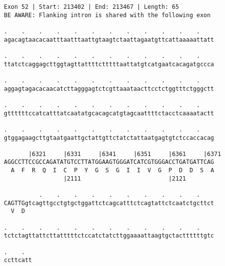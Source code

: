 \documentclass{article}
\begin{document}
\newpage
\begin{Verbatim}
Exon 52 | Start: 213402 | End: 213467 | Length: 65
BE AWARE: Flanking intron is shared with the following exon
 
.    .    .    .    .    .    .    .    .    .    .    .    
agacagtaacacaatttaatttaattgtaagtctaattagaatgttcattaaaaattatt
  
.    .    .    .    .    .    .    .    .    .    .    .    
ttatctcaggagcttggtagttattttctttttaattatgtcatgaatcacagatgccca
  
.    .    .    .    .    .    .    .    .    .    .    .    
aggagtagacacaacatcttagggagtctcgttaaataacttcctctggtttctgggctt
  
.    .    .    .    .    .    .    .    .    .    .    .    
gttttttccatcatttatcaatatgcacagcatgtagcaattttctacctcaaaatactt
  
.    .    .    .    .    .    .    .    .    .    .    .    
gtggagaagcttgtaatgaattgctattgttctatctattaatgagtgtctccaccacag
  
       |6321     |6331     |6341     |6351     |6361     |6371
AGGCCTTCCGCCAGATATGTCCTTATGGAAGTGGGATCATCGTGGGACCTGATGATTCAG
  A  F  R  Q  I  C  P  Y  G  S  G  I  I  V  G  P  D  D  S  A
                 |2111                         |2121        
  
          .    .    .    .    .    .    .    .    .    .    
CAGTTGgtcagttgcctgtgctggattctcagcatttctcagtattctcaatctgcttct
  V  D                                                      
  
.    .    .    .    .    .    .    .    .    .    .    .    
tctctagttattcttatttttctccatctatcttggaaaattaagtgctacttttttgtc
  
.    .  
ccttcatt
\end{Verbatim}
\newpage
\end{document}
